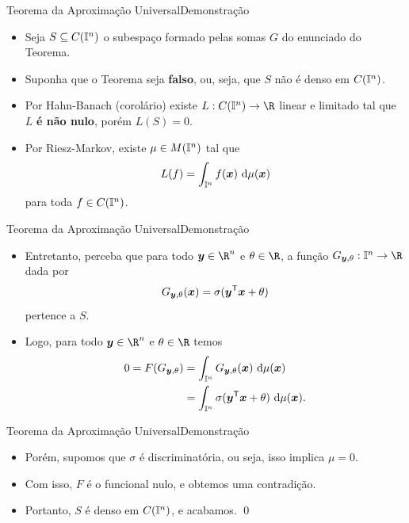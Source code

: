 \documentclass[13pt]{beamer}
\begin{document}
\begin{frame}{Teorema da Aproximação Universal}{Demonstração}
    \begin{itemize}
        \item<1-> Seja \( S \subseteq C ( \mathbb{I}^{ n } ) \) o subespaço formado pelas somas \( G \) do enunciado do Teorema.
        \item<2-> Suponha que o Teorema seja \textbf{falso}, ou, seja, que \( S \) não é denso em \( C ( \mathbb{I}^{ n } ) \).
        \item<3-> Por Hahn-Banach (corolário) existe \( L : C ( \I^{ n } ) \to \R \) linear e limitado tal que \( L \) \textbf{é não nulo}, porém \( L ( S ) = 0 \).
        \item<4-> Por Riesz-Markov, existe \( \mu \in M ( \mathbb{I}^{ n } ) \) tal que
            \begin{equation*}
                L ( f ) = \int_{ \mathbb{I}^{ n } } f ( \bm{x} ) \ \mathrm{d}\mu ( \bm{x} )
            \end{equation*}
            para toda \( f \in C ( \mathbb{I}^{ n } ) \).
    \end{itemize}
\end{frame}

\begin{frame}{Teorema da Aproximação Universal}{Demonstração}
    \begin{itemize}
        \item<1-> Entretanto, perceba que para todo \( \bfy \in \R^{ n } \) e \( \theta \in \R \), a função \( G_{ \bfy, \theta } : \I^{ n } \to \R \) dada por
            \begin{equation*}
                G_{ \bm{y}, \theta } ( \bm{x} ) = \sigma ( \bm{y}^{ \mathsf{T} } \bm{x} + \theta )
            \end{equation*}
            pertence a \( S \).
        \item<2-> Logo, para todo \( \bfy \in \R^{ n } \) e \( \theta \in \R \) temos
            \begin{align*}
                0 = F ( G_{ \bm{y}, \theta } ) &= \int_{ \mathbb{I}^{ n } } G_{ \bm{y}, \theta } ( \bm{x} ) \ \mathrm{d} \mu ( \bm{x} ) \\
                                             &= \int_{ \mathbb{I}^{ n } } \sigma ( \bm{y}^{ \mathsf{T} } \bm{x} + \theta ) \ \mathrm{d} \mu ( \bm{x} )
            .\end{align*}
    \end{itemize}
\end{frame}

\begin{frame}{Teorema da Aproximação Universal}{Demonstração}
    \begin{itemize}
        \item<1-> Porém, supomos que \( \sigma \) é discriminatória, ou seja, isso implica \( \mu = 0 \).
        \item<2-> Com isso, \( F \) é o funcional nulo, e obtemos uma contradição.
        \item<3-> Portanto, \( S \) é denso em \( C (  \mathbb{I}^{ n } ) \), e acabamos. \hfill \qed
    \end{itemize}
\end{frame}
\end{document}
